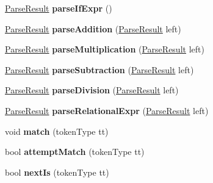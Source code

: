 \begin{DoxyCompactItemize}
\item 
\hypertarget{classParser_a555bc6f671d408208e6d049f8e9f3c86}{\hyperlink{classParseResult}{Parse\-Result} {\bfseries parse\-If\-Expr} ()}\label{classParser_a555bc6f671d408208e6d049f8e9f3c86}

\item 
\hypertarget{classParser_ae09cb2b5a7f80c6ad4ad9ccf27a746ca}{\hyperlink{classParseResult}{Parse\-Result} {\bfseries parse\-Addition} (\hyperlink{classParseResult}{Parse\-Result} left)}\label{classParser_ae09cb2b5a7f80c6ad4ad9ccf27a746ca}

\item 
\hypertarget{classParser_a52e6a57d53fc98e5819cc51b3cbe5bd5}{\hyperlink{classParseResult}{Parse\-Result} {\bfseries parse\-Multiplication} (\hyperlink{classParseResult}{Parse\-Result} left)}\label{classParser_a52e6a57d53fc98e5819cc51b3cbe5bd5}

\item 
\hypertarget{classParser_ac22cf1f77e0ca4c23942d5cbcc47eb37}{\hyperlink{classParseResult}{Parse\-Result} {\bfseries parse\-Subtraction} (\hyperlink{classParseResult}{Parse\-Result} left)}\label{classParser_ac22cf1f77e0ca4c23942d5cbcc47eb37}

\item 
\hypertarget{classParser_ad05e6cd1bf83179ecb727b83cbbd0c4e}{\hyperlink{classParseResult}{Parse\-Result} {\bfseries parse\-Division} (\hyperlink{classParseResult}{Parse\-Result} left)}\label{classParser_ad05e6cd1bf83179ecb727b83cbbd0c4e}

\item 
\hypertarget{classParser_ab42ecabc4dbe601d5ed9667351c0c0b8}{\hyperlink{classParseResult}{Parse\-Result} {\bfseries parse\-Relational\-Expr} (\hyperlink{classParseResult}{Parse\-Result} left)}\label{classParser_ab42ecabc4dbe601d5ed9667351c0c0b8}

\item 
\hypertarget{classParser_a3199aab5275c8b6477245eb866fabf35}{void {\bfseries match} (token\-Type tt)}\label{classParser_a3199aab5275c8b6477245eb866fabf35}

\item 
\hypertarget{classParser_a151ffb920a67527813d77bc4ba44c4a7}{bool {\bfseries attempt\-Match} (token\-Type tt)}\label{classParser_a151ffb920a67527813d77bc4ba44c4a7}

\item 
\hypertarget{classParser_a67a10b685bd263477b5f59f1923cdec3}{bool {\bfseries next\-Is} (token\-Type tt)}\label{classParser_a67a10b685bd263477b5f59f1923cdec3}


\end{DoxyCompactItemize}
